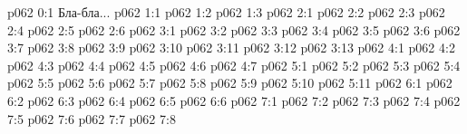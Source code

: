 \author{Носитель Жизни}
\vs p062 0:1  Бла-бла...
\vs p062 1:1 
\vs p062 1:2 
\vs p062 1:3 
\vs p062 2:1 
\vs p062 2:2 
\vs p062 2:3 
\vs p062 2:4 
\vs p062 2:5 
\vs p062 2:6 
\vs p062 3:1 
\vs p062 3:2 
\vs p062 3:3 
\vs p062 3:4 
\vs p062 3:5 
\vs p062 3:6 \pc 
\vs p062 3:7 
\vs p062 3:8 
\vs p062 3:9 \pc 
\vs p062 3:10 
\vs p062 3:11 \pc 
\vs p062 3:12 
\vs p062 3:13 
\vs p062 4:1 
\vs p062 4:2 
\vs p062 4:3 
\vs p062 4:4 \pc 
\vs p062 4:5 
\vs p062 4:6 
\vs p062 4:7 \pc 
{}
\vs p062 5:1 
\vs p062 5:2 
\vs p062 5:3 
\vs p062 5:4 
\vs p062 5:5 
\vs p062 5:6 
\vs p062 5:7 
\vs p062 5:8 
\vs p062 5:9 
\vs p062 5:10 
\vs p062 5:11 
\vs p062 6:1 
\vs p062 6:2 
\vs p062 6:3 
\vs p062 6:4 
\vs p062 6:5 
\vs p062 6:6 
\vs p062 7:1 
\vs p062 7:2 
\vs p062 7:3 
\vs p062 7:4 
\vs p062 7:5 
\vs p062 7:6 
\vs p062 7:7 
\vsetoff
\vs p062 7:8 
\quizlink
